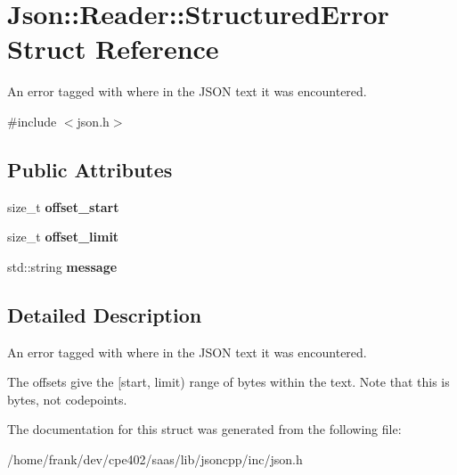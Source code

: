 \hypertarget{struct_json_1_1_reader_1_1_structured_error}{}\section{Json\+:\+:Reader\+:\+:Structured\+Error Struct Reference}
\label{struct_json_1_1_reader_1_1_structured_error}


An error tagged with where in the J\+S\+O\+N text it was encountered.  




{\ttfamily \#include $<$json.\+h$>$}

\subsection*{Public Attributes}
\begin{DoxyCompactItemize}
\item 
\hypertarget{struct_json_1_1_reader_1_1_structured_error_a160dae4eb3464a2209b743c755baf65f}{}size\+\_\+t {\bfseries offset\+\_\+start}\label{struct_json_1_1_reader_1_1_structured_error_a160dae4eb3464a2209b743c755baf65f}

\item 
\hypertarget{struct_json_1_1_reader_1_1_structured_error_a80747dae744bcc80a9bc81c94fd42e13}{}size\+\_\+t {\bfseries offset\+\_\+limit}\label{struct_json_1_1_reader_1_1_structured_error_a80747dae744bcc80a9bc81c94fd42e13}

\item 
\hypertarget{struct_json_1_1_reader_1_1_structured_error_ab8755e5201b78c6ae077338f8819e6e6}{}std\+::string {\bfseries message}\label{struct_json_1_1_reader_1_1_structured_error_ab8755e5201b78c6ae077338f8819e6e6}

\end{DoxyCompactItemize}


\subsection{Detailed Description}
An error tagged with where in the J\+S\+O\+N text it was encountered. 

The offsets give the \mbox{[}start, limit) range of bytes within the text. Note that this is bytes, not codepoints. 

The documentation for this struct was generated from the following file\+:\begin{DoxyCompactItemize}
\item 
/home/frank/dev/cpe402/saas/lib/jsoncpp/inc/json.\+h\end{DoxyCompactItemize}
